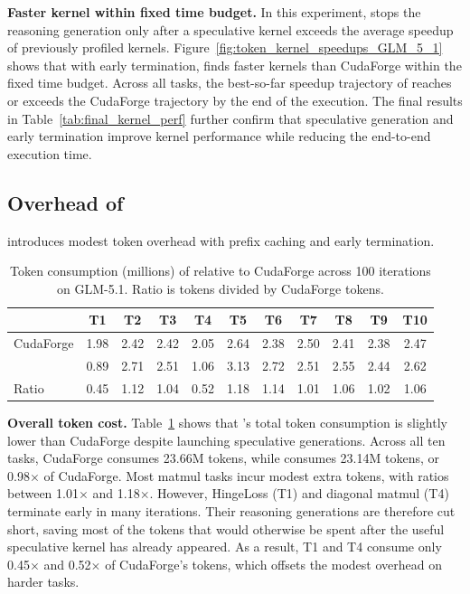 \noindent\textbf{Faster kernel within fixed time budget.}
In this experiment, \sysname{} stops the reasoning generation only after a
speculative kernel exceeds the average speedup of previously profiled kernels.
Figure~\ref{fig:token_kernel_speedups_GLM_5_1} shows that with early termination,
\sysname{} finds faster kernels than CudaForge within the fixed time budget.
Across all tasks, the best-so-far speedup trajectory of \sysname{} reaches or exceeds
the CudaForge trajectory by the end of the execution.
The final results in Table~\ref{tab:final_kernel_perf} further confirm that
speculative generation and early termination improve kernel performance while reducing
the end-to-end execution time.

\subsection{Overhead of \sysname{}}\label{subsec:eval_token_consumption}

\sysname{} introduces modest token overhead with prefix caching and early termination.

\begin{table}[t]
    \centering
    \small
    \setlength{\tabcolsep}{2.3pt}
    \caption{Token consumption (millions) of \sysname{} relative to CudaForge across 100 iterations on GLM-5.1. Ratio is \sysname{} tokens divided by CudaForge tokens.}
    \vspace{-10pt}
    \label{tab:token_overhead}
    \begin{tabular}{lcccccccccc}
        \toprule
        & T1 & T2 & T3 & T4 & T5 & T6 & T7 & T8 & T9 & T10 \\
        \midrule
        CudaForge & 1.98 & 2.42 & 2.42 & 2.05 & 2.64 & 2.38 & 2.50 & 2.41 & 2.38 & 2.47 \\
        \sysname{} & 0.89 & 2.71 & 2.51 & 1.06 & 3.13 & 2.72 & 2.51 & 2.55 & 2.44 & 2.62 \\
        Ratio & 0.45 & 1.12 & 1.04 & 0.52 & 1.18 & 1.14 & 1.01 & 1.06 & 1.02 & 1.06 \\
        \bottomrule
    \end{tabular}
    \vspace{-15pt}
\end{table}

\noindent\textbf{Overall token cost.}
Table~\ref{tab:token_overhead} shows that \sysname{}'s total token consumption is
slightly lower than CudaForge despite launching speculative generations.
Across all ten tasks, CudaForge consumes 23.66M tokens, while \sysname{} consumes
23.14M tokens, or 0.98$\times$ of CudaForge.
Most matmul tasks incur modest extra tokens, with ratios between 1.01$\times$
and 1.18$\times$.
However, HingeLoss (T1) and diagonal matmul (T4) terminate early in many
iterations.
Their reasoning generations are therefore cut short, saving most of the
tokens that would otherwise be spent after the useful speculative kernel has
already appeared.
As a result, T1 and T4 consume only 0.45$\times$ and 0.52$\times$ of CudaForge's
tokens, which offsets the modest overhead on harder tasks.

